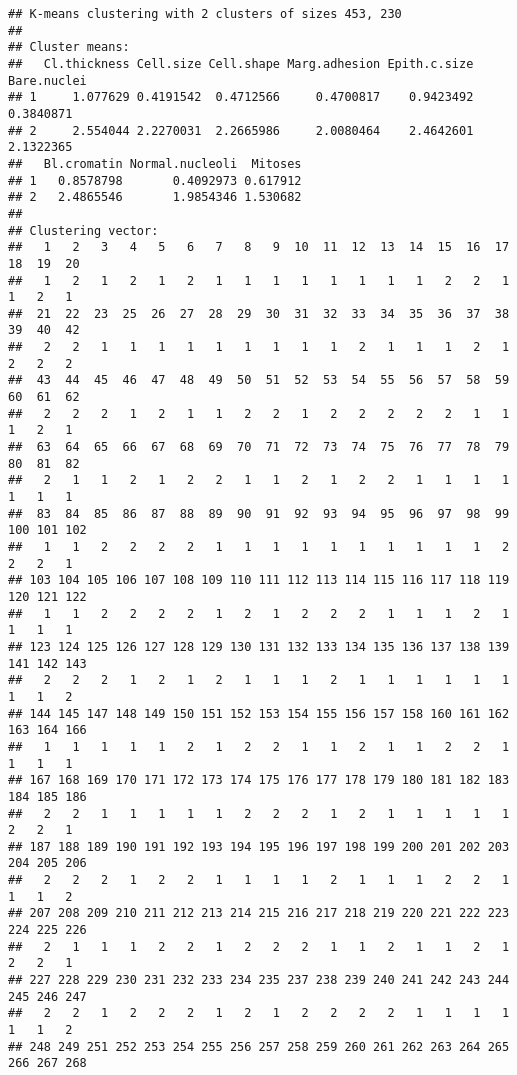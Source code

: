 \documentclass[
]{article}
\begin{document}
\begin{verbatim}
## K-means clustering with 2 clusters of sizes 453, 230
## 
## Cluster means:
##   Cl.thickness Cell.size Cell.shape Marg.adhesion Epith.c.size Bare.nuclei
## 1     1.077629 0.4191542  0.4712566     0.4700817    0.9423492   0.3840871
## 2     2.554044 2.2270031  2.2665986     2.0080464    2.4642601   2.1322365
##   Bl.cromatin Normal.nucleoli  Mitoses
## 1   0.8578798       0.4092973 0.617912
## 2   2.4865546       1.9854346 1.530682
## 
## Clustering vector:
##   1   2   3   4   5   6   7   8   9  10  11  12  13  14  15  16  17  18  19  20 
##   1   2   1   2   1   2   1   1   1   1   1   1   1   1   2   2   1   1   2   1 
##  21  22  23  25  26  27  28  29  30  31  32  33  34  35  36  37  38  39  40  42 
##   2   2   1   1   1   1   1   1   1   1   1   2   1   1   1   2   1   2   2   2 
##  43  44  45  46  47  48  49  50  51  52  53  54  55  56  57  58  59  60  61  62 
##   2   2   2   1   2   1   1   2   2   1   2   2   2   2   2   1   1   1   2   1 
##  63  64  65  66  67  68  69  70  71  72  73  74  75  76  77  78  79  80  81  82 
##   2   1   1   2   1   2   2   1   1   2   1   2   2   1   1   1   1   1   1   1 
##  83  84  85  86  87  88  89  90  91  92  93  94  95  96  97  98  99 100 101 102 
##   1   1   2   2   2   2   1   1   1   1   1   1   1   1   1   1   2   2   2   1 
## 103 104 105 106 107 108 109 110 111 112 113 114 115 116 117 118 119 120 121 122 
##   1   1   2   2   2   2   1   2   1   2   2   2   1   1   1   2   1   1   1   1 
## 123 124 125 126 127 128 129 130 131 132 133 134 135 136 137 138 139 141 142 143 
##   2   2   2   1   2   1   2   1   1   1   2   1   1   1   1   1   1   1   1   2 
## 144 145 147 148 149 150 151 152 153 154 155 156 157 158 160 161 162 163 164 166 
##   1   1   1   1   1   2   1   2   2   1   1   2   1   1   2   2   1   1   1   1 
## 167 168 169 170 171 172 173 174 175 176 177 178 179 180 181 182 183 184 185 186 
##   2   2   1   1   1   1   1   2   2   2   1   2   1   1   1   1   1   2   2   1 
## 187 188 189 190 191 192 193 194 195 196 197 198 199 200 201 202 203 204 205 206 
##   2   2   2   1   2   2   1   1   1   1   2   1   1   1   2   2   1   1   1   2 
## 207 208 209 210 211 212 213 214 215 216 217 218 219 220 221 222 223 224 225 226 
##   2   1   1   1   2   2   1   2   2   2   1   1   2   1   1   2   1   2   2   1 
## 227 228 229 230 231 232 233 234 235 237 238 239 240 241 242 243 244 245 246 247 
##   2   2   1   2   2   2   1   2   1   2   2   2   2   1   1   1   1   1   1   2 
## 248 249 251 252 253 254 255 256 257 258 259 260 261 262 263 264 265 266 267 268 

\end{verbatim}
\end{document}
